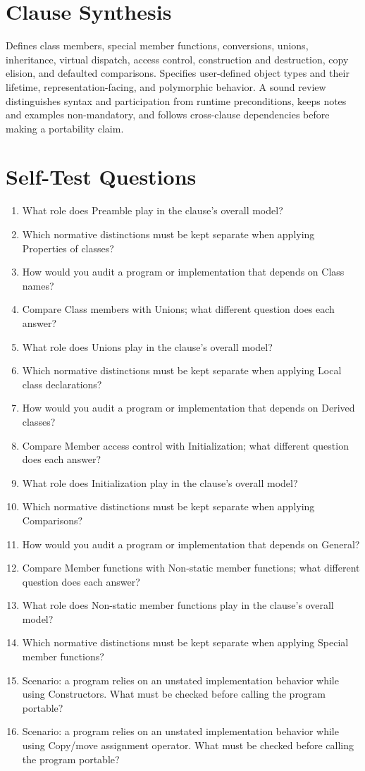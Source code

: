 \documentclass[11pt,letterpaper]{article}
\begin{document}
\section{Clause Synthesis}
\begin{CornellReferenceOrientationBox}Defines class members, special member functions, conversions, unions, inheritance, virtual dispatch, access control, construction and destruction, copy elision, and defaulted comparisons. Specifies user-defined object types and their lifetime, representation-facing, and polymorphic behavior. A sound review distinguishes syntax and participation from runtime preconditions, keeps notes and examples non-mandatory, and follows cross-clause dependencies before making a portability claim.\end{CornellReferenceOrientationBox}
\section{Self-Test Questions}
\begin{enumerate}
\item What role does Preamble play in the clause's overall model?
\item Which normative distinctions must be kept separate when applying Properties of classes?
\item How would you audit a program or implementation that depends on Class names?
\item Compare Class members with Unions; what different question does each answer?
\item What role does Unions play in the clause's overall model?
\item Which normative distinctions must be kept separate when applying Local class declarations?
\item How would you audit a program or implementation that depends on Derived classes?
\item Compare Member access control with Initialization; what different question does each answer?
\item What role does Initialization play in the clause's overall model?
\item Which normative distinctions must be kept separate when applying Comparisons?
\item How would you audit a program or implementation that depends on General?
\item Compare Member functions with Non-static member functions; what different question does each answer?
\item What role does Non-static member functions play in the clause's overall model?
\item Which normative distinctions must be kept separate when applying Special member functions?
\item Scenario: a program relies on an unstated implementation behavior while using Constructors. What must be checked before calling the program portable?
\item Scenario: a program relies on an unstated implementation behavior while using Copy/move assignment operator. What must be checked before calling the program portable?
\end{enumerate}
\end{document}
